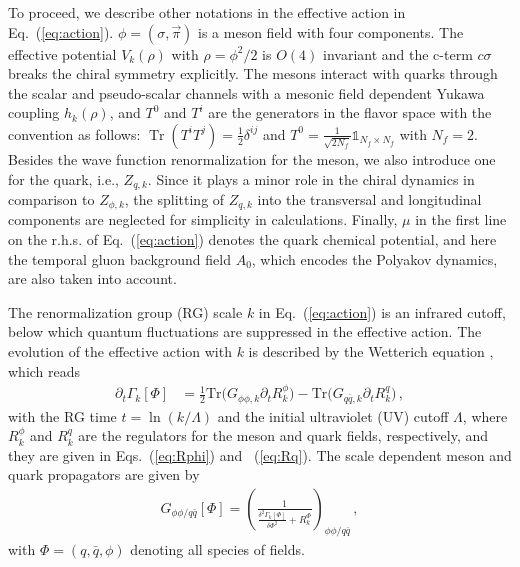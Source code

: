 \documentclass[%
reprint,
superscriptaddress,
showpacs,preprintnumbers,
 amsmath,amssymb,
 aps,
prd,
]{revtex4-1}
\newcommand{\Tr}{\ensuremath{\operatorname{Tr}}}
\def\Eq#1{Eq.~(\ref{#1})}
\begin{document}
To proceed, we describe other notations in the effective action in \Eq{eq:action}. $\phi=\left(\sigma,\vec{\pi}\right)$ is a meson field with four components. The effective potential $V_k(\rho)$ with $\rho=\phi^2/2$ is $O(4)$ invariant and the c-term $c\sigma$ breaks the chiral symmetry explicitly. The mesons interact with quarks through the scalar and pseudo-scalar channels with a mesonic field dependent Yukawa coupling $h_k(\rho)$, and $T^0$ and $T^i$ are the generators in the flavor space with the convention as follows: $\Tr(T^{i}T^{j})=\frac{1}{2}\delta^{ij}$ and $T^{0}=\frac{1}{\sqrt{2N_{f}}}\mathbb{1}_{N_{f}\times N_{f}}$ with $N_{f}=2$. Besides the wave function renormalization for the meson, we also introduce one for the quark, i.e., $Z_{q,k}$. Since it plays a minor role in the chiral dynamics in comparison to $Z_{\phi,k}$, the splitting of $Z_{q,k}$ into the transversal and longitudinal components are neglected for simplicity in calculations. Finally, $\mu$ in the first line on the r.h.s. of \Eq{eq:action} denotes the quark chemical potential, and here the temporal gluon background field $A_0$, which encodes the Polyakov dynamics, are also taken into account.

The renormalization group (RG) scale $k$ in \Eq{eq:action} is an infrared cutoff, below which quantum fluctuations are suppressed in the effective action. The evolution of the effective action with $k$ is described by the Wetterich equation \cite{Wetterich:1992yh}, which reads 
\begin{align}
  \partial_t\Gamma_k[\Phi]&=\frac{1}{2}\mathrm{Tr}\big(G_{\phi\phi,k}\partial_t R^{\phi}_{k}\big)-\mathrm{Tr}\big(G_{q\bar{q},k}\partial_t R^{q}_{k}\big)\,, \label{eq:WetterichEqPQM}
\end{align}
with the RG time $t=\ln (k/\Lambda)$ and the initial ultraviolet (UV) cutoff $\Lambda$, where $R^{\phi}_{k}$ and $R^{q}_{k}$ are the regulators for the meson and quark fields, respectively, and they are given in Eqs.~(\ref{eq:Rphi}) and ~(\ref{eq:Rq}). The scale dependent meson and quark propagators are given by
\begin{align}
  G_{\phi\phi/q\bar{q}}[\Phi]=\left( \frac{1}{\frac{\delta^2\Gamma_k[\Phi]}{\delta\Phi^2}+R^{\Phi}_{k}} \right)_{\phi\phi/q\bar{q}}\,, \label{eq:props}
\end{align}
with $\Phi=(q,\bar q,\phi)$ denoting all species of fields.
\end{document}
